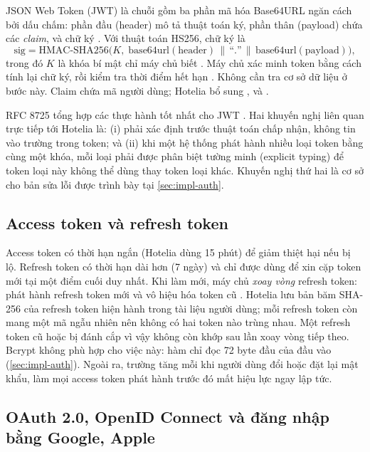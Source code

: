 JSON Web Token (JWT) là chuỗi gồm ba phần mã hóa Base64URL ngăn cách bởi dấu chấm: phần đầu (header) mô tả thuật toán ký, phần thân (payload) chứa các \emph{claim}, và chữ ký \cite{rfc7519,rfc7515}. Với thuật toán HS256, chữ ký là
\begin{equation}
  \text{sig} = \text{HMAC-SHA256}\big(K,\; \text{base64url}(\text{header}) \,\|\, \text{``.''} \,\|\, \text{base64url}(\text{payload})\big),
\end{equation}
trong đó $K$ là khóa bí mật chỉ máy chủ biết \cite{rfc2104}. Máy chủ xác minh token bằng cách tính lại chữ ký, rồi kiểm tra thời điểm hết hạn . Không cần tra cơ sở dữ liệu ở bước này. Claim  chứa mã người dùng; Hotelia bổ sung ,  và .

RFC 8725 tổng hợp các thực hành tốt nhất cho JWT \cite{rfc8725}. Hai khuyến nghị liên quan trực tiếp tới Hotelia là: (i) phải xác định trước thuật toán chấp nhận, không tin vào trường  trong token; và (ii) khi một hệ thống phát hành nhiều loại token bằng cùng một khóa, mỗi loại phải được phân biệt tường minh (explicit typing) để token loại này không thể dùng thay token loại khác. Khuyến nghị thứ hai là cơ sở cho bản sửa lỗi được trình bày tại \cref{sec:impl-auth}.

\subsection{Access token và refresh token}

Access token có thời hạn ngắn (Hotelia dùng 15 phút) để giảm thiệt hại nếu bị lộ. Refresh token có thời hạn dài hơn (7 ngày) và chỉ được dùng để xin cặp token mới tại một điểm cuối duy nhất. Khi làm mới, máy chủ \emph{xoay vòng} refresh token: phát hành refresh token mới và vô hiệu hóa token cũ \cite{rfc9700}. Hotelia lưu bản băm SHA-256 của refresh token hiện hành trong tài liệu người dùng; mỗi refresh token còn mang một mã ngẫu nhiên  nên không có hai token nào trùng nhau. Một refresh token cũ hoặc bị đánh cắp vì vậy không còn khớp sau lần xoay vòng tiếp theo. Bcrypt không phù hợp cho việc này: hàm chỉ đọc 72 byte đầu của đầu vào (\cref{sec:impl-auth}). Ngoài ra, trường  tăng mỗi khi người dùng đổi hoặc đặt lại mật khẩu, làm mọi access token phát hành trước đó mất hiệu lực ngay lập tức.

\subsection{OAuth 2.0, OpenID Connect và đăng nhập bằng Google, Apple}

